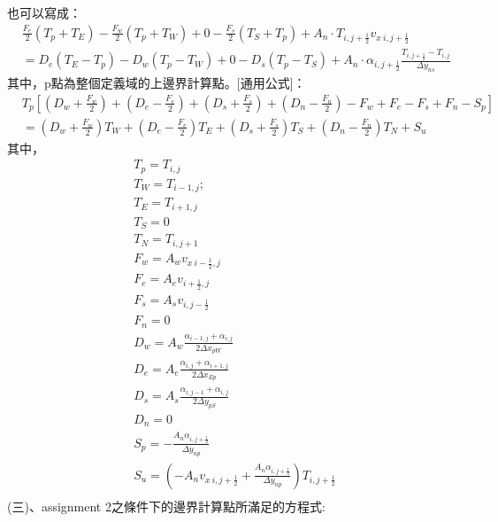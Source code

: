 \documentclass[12pt]{article}
\begin{document}
\noindent 也可以寫成： 
\begin{equation}
\begin{split}
  &\frac{F_{e}}{2}(T_{p} + T_{E})- \frac{F_{w}}{2}(T_{p} + T_{W})+ 0 -\frac{F_{s}}{2}(T_{S} + T_{p}) + A_{n} \cdot T_{i,j+\frac{1}{2}}v_{x\ i,j+\frac{1}{2}} \\
  & = D_{e} (T_{E}-T_{p} ) - D_{w}(T_{p} - T_{W}) + 0  - D_{s} (T_{p}-T_{S}) + A_{n} \cdot \alpha_{i,j+\frac{1}{2}} \frac{T_{i,j+\frac{1}{2}}-T_{i,j}}{\Delta y_{ns}}
\end{split}
\end{equation}
\noindent 其中，p點為整個定義域的上邊界計算點。[通用公式]：
\begin{equation}
\begin{split}
  &T_{p}\left[(D_{w}+\frac{F_{w}}{2})+(D_{e}-\frac{F_{e}}{2})+(D_{s}+\frac{F_{s}}{2})+(D_{n}-\frac{F_{n}}{2}) - F_{w} + F_{e} - F_{s} + F_{n}  - S_{p}\right] \\
  &= (D_{w}+\frac{F_{w}}{2})T_{W}+(D_{e}-\frac{F_{e}}{2})T_{E}+(D_{s}+\frac{F_{s}}{2})T_{S}+(D_{n}-\frac{F_{n}}{2})T_{N} + S_{u}
\end{split}
\end{equation}
\noindent 其中，
\begin{equation}
  \begin{split}
    &T_{p} = T_{i,j}\\
    &T_{W} = T_{i-1,j} ;\\
    &T_{E} = T_{i+1,j} \\
    &T_{S} = 0 \\
    &T_{N} = T_{i,j+1}\\
    &F_{w} =  A_{w}v_{x\ i-\frac{1}{2},j}\\
    &F_{e} = A_{e}v_{i+\frac{1}{2},j}\\
    &F_{s} = A_{s}v_{i,j-\frac{1}{2}}\\
    &F_{n} = 0\\
    &D_{w} = A_{w}\frac{\alpha_{i-1,j} + \alpha_{i,j}}{2\Delta x_{pW}}\\
    &D_{e} = A_{e} \frac{\alpha_{i,j}+\alpha_{i+1,j}}{2\Delta x_{Ep} }\\
    &D_{s} = A_{s} \frac{\alpha_{i,j-1}+\alpha_{i,j}}{2\Delta y_{pS}}\\
    &D_{n} = 0\\
    &S_{p} = -\frac{A_{n}\alpha_{i,j+\frac{1}{2}}}{\Delta y_{np}}\\
    &S_{u} = (-A_{n} v_{x\ i,j+\frac{1}{2}} + \frac{A_{n}\alpha_{i,j+\frac{1}{2}}}{\Delta y_{np}})T_{i,j+\frac{1}{2}}\\
  \end{split}
\end{equation}
\noindent (三)、assignment 2之條件下的邊界計算點所滿足的方程式:\\
\end{document}
